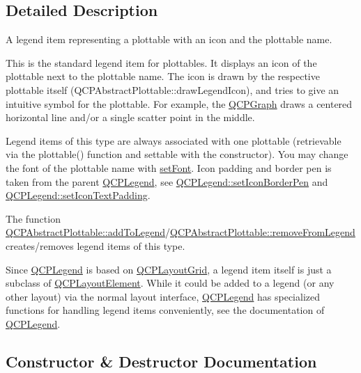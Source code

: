 \subsection{Detailed Description}
A legend item representing a plottable with an icon and the plottable name. 

This is the standard legend item for plottables. It displays an icon of the plottable next to the plottable name. The icon is drawn by the respective plottable itself (Q\+C\+P\+Abstract\+Plottable\+::draw\+Legend\+Icon), and tries to give an intuitive symbol for the plottable. For example, the \hyperlink{classQCPGraph}{Q\+C\+P\+Graph} draws a centered horizontal line and/or a single scatter point in the middle.

Legend items of this type are always associated with one plottable (retrievable via the plottable() function and settable with the constructor). You may change the font of the plottable name with \hyperlink{classQCPAbstractLegendItem_a409c53455d8112f71d70c0c43eb10265}{set\+Font}. Icon padding and border pen is taken from the parent \hyperlink{classQCPLegend}{Q\+C\+P\+Legend}, see \hyperlink{classQCPLegend_a2f2c93d18a651f4ff294bb3f026f49b8}{Q\+C\+P\+Legend\+::set\+Icon\+Border\+Pen} and \hyperlink{classQCPLegend_a62973bd69d5155e8ea3141366e8968f6}{Q\+C\+P\+Legend\+::set\+Icon\+Text\+Padding}.

The function \hyperlink{classQCPAbstractPlottable_aa64e93cb5b606d8110d2cc0a349bb30f}{Q\+C\+P\+Abstract\+Plottable\+::add\+To\+Legend}/\hyperlink{classQCPAbstractPlottable_a26d936d11852ea08e6bc0edae3a514a2}{Q\+C\+P\+Abstract\+Plottable\+::remove\+From\+Legend} creates/removes legend items of this type.

Since \hyperlink{classQCPLegend}{Q\+C\+P\+Legend} is based on \hyperlink{classQCPLayoutGrid}{Q\+C\+P\+Layout\+Grid}, a legend item itself is just a subclass of \hyperlink{classQCPLayoutElement}{Q\+C\+P\+Layout\+Element}. While it could be added to a legend (or any other layout) via the normal layout interface, \hyperlink{classQCPLegend}{Q\+C\+P\+Legend} has specialized functions for handling legend items conveniently, see the documentation of \hyperlink{classQCPLegend}{Q\+C\+P\+Legend}. 

\subsection{Constructor \& Destructor Documentation}
